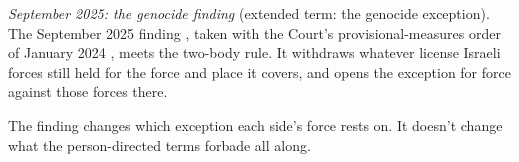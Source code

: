 \emph{September 2025: the genocide finding} (extended term: the genocide exception). The September 2025 finding \autocite{coiopt2025genocide}, taken with the Court's provisional-measures order of January 2024 \autocite{icj2024sagenocidepm}, meets the two-body rule.
It withdraws whatever license Israeli forces still held for the force and place it covers, and opens the exception for force against those forces there.

The finding changes which exception each side's force rests on. It doesn't change what the person-directed terms forbade all along.
